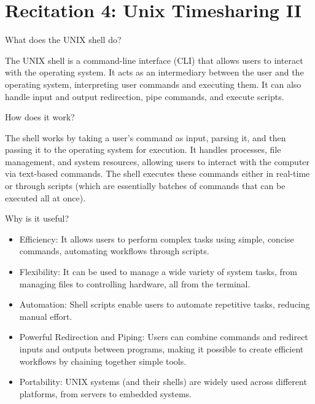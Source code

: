 \documentclass[a4paper]{article}
\begin{document}
\section*{Recitation 4: Unix Timesharing II}

\begin{Exercise}
    What does the UNIX shell do?
\end{Exercise} 
\begin{Solution}
The UNIX shell is a command-line interface (CLI) that allows users to interact with the operating system. It acts as an intermediary between the user and the operating system, interpreting user commands and executing them. It can also handle input and output redirection, pipe commands, and execute scripts.
\end{Solution}

\begin{Exercise}
    How does it work?
\end{Exercise}
\begin{Solution}
    The shell works by taking a user's command as input, parsing it, and then passing it to the operating system for execution. It handles processes, file management, and system resources, allowing users to interact with the computer via text-based commands. The shell executes these commands either in real-time or through scripts (which are essentially batches of commands that can be executed all at once).
\end{Solution}
\begin{Exercise}
    Why is it useful?
\end{Exercise}
\begin{Solution}
    \begin{itemize}
        \item Efficiency: It allows users to perform complex tasks using simple, concise commands, automating workflows through scripts.
        \item Flexibility: It can be used to manage a wide variety of system tasks, from managing files to controlling hardware, all from the terminal.
        \item Automation: Shell scripts enable users to automate repetitive tasks, reducing manual effort.
        \item Powerful Redirection and Piping: Users can combine commands and redirect inputs and outputs between programs, making it possible to create efficient workflows by chaining together simple tools.
        \item Portability: UNIX systems (and their shells) are widely used across different platforms, from servers to embedded systems.
    \end{itemize}
\end{Solution}
\end{document}

